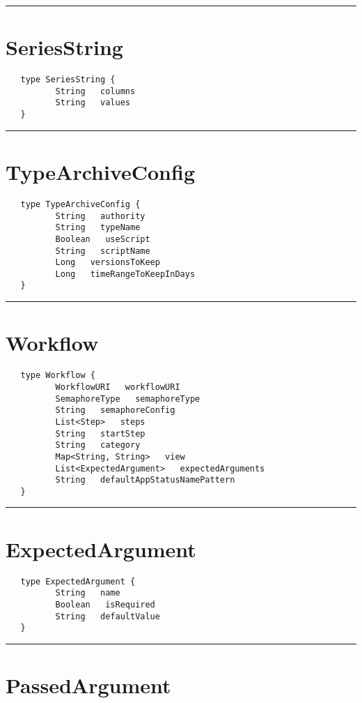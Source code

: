 \rule{12cm}{2pt}
\section{SeriesString}
\label{type:SeriesString}

\begin{Verbatim}
   type SeriesString {
          String   columns
          String   values
   }
\end{Verbatim}

\rule{12cm}{2pt}
\section{TypeArchiveConfig}
\label{type:TypeArchiveConfig}

\begin{Verbatim}
   type TypeArchiveConfig {
          String   authority
          String   typeName
          Boolean   useScript
          String   scriptName
          Long   versionsToKeep
          Long   timeRangeToKeepInDays
   }
\end{Verbatim}

\rule{12cm}{2pt}
\section{Workflow}
\label{type:Workflow}

\begin{Verbatim}
   type Workflow {
          WorkflowURI   workflowURI
          SemaphoreType   semaphoreType
          String   semaphoreConfig
          List<Step>   steps
          String   startStep
          String   category
          Map<String, String>   view
          List<ExpectedArgument>   expectedArguments
          String   defaultAppStatusNamePattern
   }
\end{Verbatim}

\rule{12cm}{2pt}
\section{ExpectedArgument}
\label{type:ExpectedArgument}

\begin{Verbatim}
   type ExpectedArgument {
          String   name
          Boolean   isRequired
          String   defaultValue
   }
\end{Verbatim}

\rule{12cm}{2pt}
\section{PassedArgument}
\label{type:PassedArgument}


